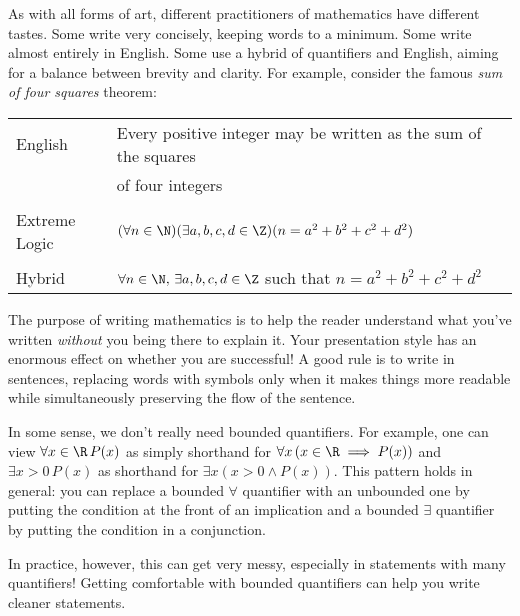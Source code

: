 \begin{aside}

As with all forms of art, different practitioners of mathematics have different tastes. Some write very concisely, keeping words to a minimum. Some write almost entirely in English. Some use a hybrid of quantifiers and English, aiming for a balance between brevity and clarity. For example, consider the famous \emph{sum of four squares} theorem:
\begin{center}
\begin{tabular}{l|l}
English & Every positive integer may be written as the sum of the squares\\
&of four integers\\[4pt]\hline
\\[-8pt]
Extreme Logic & $(\forall n\in\N)(\exists a,b,c,d\in\Z)(n=a^2+b^2+c^2+d^2)$\\[4pt]\hline
\\[-8pt]
Hybrid & $\forall n\in\N,\, \exists a,b,c,d\in\Z$ such that $n=a^2+b^2+c^2+d^2$
\end{tabular}
\end{center}

\noindent The purpose of writing mathematics is to help the reader understand what you've written \emph{without} you being there to explain it. Your presentation style has an enormous effect on whether you are successful! A good rule is to write in sentences, replacing words with symbols only when it makes things more readable while simultaneously preserving the flow of the sentence. 

\end{aside}\goodbreak

\begin{remark}
In some sense, we don't really need bounded quantifiers. For example, one can view ${\forall x \in \R \, P(x)}$ as simply shorthand for $\forall x \, (x \in \R \implies P(x))$ and $\exists x > 0 \, P(x)$ as shorthand for $\exists x (x > 0 \land P(x))$. This pattern holds in general: you can replace a bounded $\forall$ quantifier with an unbounded one by putting the condition at the front of an implication and a bounded $\exists$ quantifier by putting the condition in a conjunction.

\noindent In practice, however, this can get very messy, especially in statements with many quantifiers! Getting comfortable with bounded quantifiers can help you write cleaner statements.
\end{remark}


